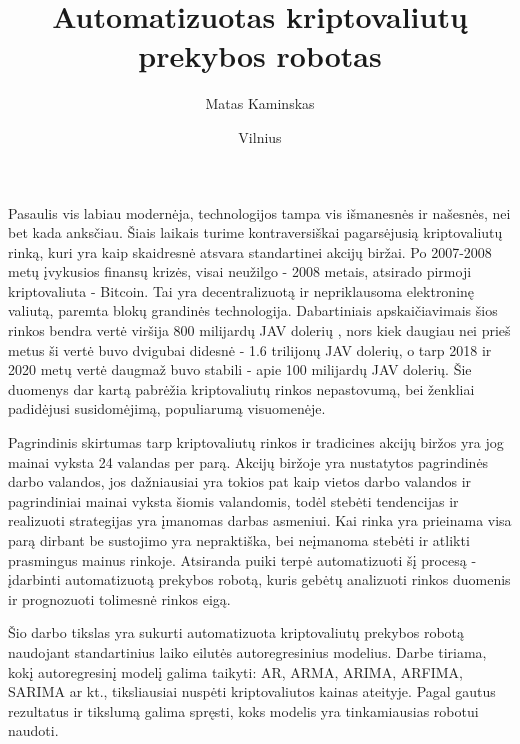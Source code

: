 \documentclass{VUMIFInfKursinis}
\institute{Informatikos institutas}  %
\title{Automatizuotas kriptovaliutų prekybos robotas}
\author{Matas Kaminskas}
\date{Vilnius \\ \the\year}
\begin{document}
\maketitle

\tableofcontents

Pasaulis vis labiau modernėja, technologijos tampa vis išmanesnės ir našesnės, nei bet kada anksčiau. Šiais laikais turime kontraversiškai pagarsėjusią
kriptovaliutų rinką, kuri yra kaip skaidresnė atsvara standartinei akcijų biržai. Po 2007-2008 metų įvykusios finansų krizės,
visai neužilgo - \cite{nakamoto2008bitcoin} 2008 metais, atsirado pirmoji kriptovaliuta - Bitcoin. Tai yra decentralizuotą ir nepriklausoma elektroninę valiutą, paremta
blokų grandinės technologija. Dabartiniais apskaičiavimais šios rinkos bendra vertė viršija 800 milijardų JAV dolerių \cite{CoinMarketCap},
nors kiek daugiau nei prieš metus ši vertė buvo dvigubai didesnė - 1.6 trilijonų JAV dolerių, o tarp 2018 ir 2020 metų vertė daugmaž buvo stabili - apie 100 milijardų JAV dolerių.
Šie duomenys dar kartą pabrėžia kriptovaliutų rinkos nepastovumą, bei ženkliai padidėjusi susidomėjimą, populiarumą visuomenėje.    


Pagrindinis skirtumas tarp kriptovaliutų rinkos ir tradicines akcijų biržos yra jog mainai vyksta 24 valandas per parą. Akcijų biržoje yra nustatytos pagrindinės darbo valandos,
jos dažniausiai yra tokios pat kaip vietos darbo valandos ir pagrindiniai mainai vyksta šiomis valandomis, todėl stebėti tendencijas ir realizuoti strategijas yra įmanomas darbas asmeniui.
Kai rinka yra prieinama visa parą dirbant be sustojimo yra nepraktiška, bei neįmanoma stebėti ir atlikti prasmingus mainus rinkoje. Atsiranda puiki terpė automatizuoti šį 
procesą - įdarbinti automatizuotą prekybos robotą, kuris gebėtų analizuoti rinkos duomenis ir prognozuoti tolimesnė rinkos eigą.


Šio darbo tikslas yra sukurti automatizuota kriptovaliutų prekybos robotą naudojant standartinius laiko eilutės autoregresinius modelius. 
Darbe tiriama, kokį autoregresinį modelį galima taikyti: AR, ARMA, ARIMA, ARFIMA, SARIMA ar kt., tiksliausiai nuspėti kriptovaliutos
kainas ateityje. Pagal gautus rezultatus ir tikslumą galima spręsti, koks modelis yra tinkamiausias robotui naudoti.
\end{document}
